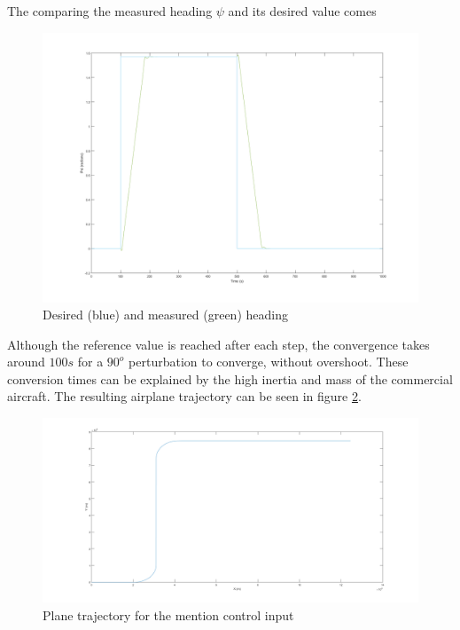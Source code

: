 The comparing the measured heading $\psi$ and its desired value comes 
\begin{figure}[h]
\centering
\includegraphics[width=\textwidth]{Figures/Results/heading_test.png}
\caption[Desired and measured heading]{Desired (blue) and measured (green) heading}
\label{fig:heading_test}
\end{figure}

Although the reference value is reached after each step, the convergence takes around $100s$ for a $90^o$ perturbation to converge, without overshoot. These conversion times can be explained by the high inertia and mass of the commercial aircraft. The resulting airplane trajectory can be seen in figure \ref{fig:trajectory}.

\begin{figure}[h]
\centering
\includegraphics[width=\textwidth]{Figures/Results/trajectory.png}
\caption[Plane trajectory]{Plane trajectory for the mention control input}
\label{fig:trajectory}
\end{figure}

